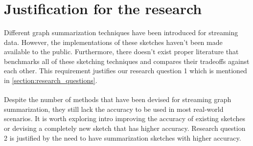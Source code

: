 \section{Justification for the research}

\paragraph{}
Different graph summarization techniques have been introduced for streaming data\cite{cormode_improved_2003, zhao_gsketch:_2011, roy_augmented_2016, tang_graph_2016, khan_query-friendly_2016, gou_fast_2018}. However, the implementations of these sketches haven’t been made available to the public. Furthermore, there doesn’t exist proper literature that benchmarks all of these sketching techniques and compares their tradeoffs against each other. This requirement justifies our research question 1 which is mentioned in \autoref{section:research_questions}.

\paragraph{}
Despite the number of methods that have been devised for streaming graph summarization, they still lack the accuracy to be used in most real-world scenarios. It is worth exploring intro improving the accuracy of existing sketches or devising a completely new sketch that has higher accuracy. Research question 2 is justified by the need to have summarization sketches with higher accuracy.